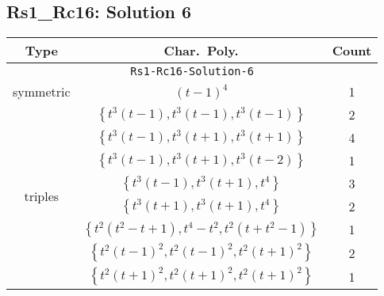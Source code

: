 \documentclass{article}
\begin{document}
        \subsection{Rs1\_Rc16: Solution 6}
        \begin{tabular}{|c|c|c|}
        \hline
        \textbf{Type} & \textbf{Char.~Poly.} & \textbf{Count} \\
        \hline \multicolumn{3}{|c|}{\texttt{Rs1-Rc16-Solution-6}} \\ \hline
        \multirow{1}{*}{symmetric}
        & $(t - 1)^4$ & 1 \\
        \hline
        \multirow{8}{*}{triples}
         & $\left\{t^3(t - 1),t^3(t - 1),t^3(t - 1)\right\}$ & 2 \\
         & $\left\{t^3(t - 1),t^3(t + 1),t^3(t + 1)\right\}$ & 4 \\
         & $\left\{t^3(t - 1),t^3(t + 1),t^3(t - 2)\right\}$ & 1 \\
         & $\left\{t^3(t - 1),t^3(t + 1),t^4\right\}$ & 3 \\
         & $\left\{t^3(t + 1),t^3(t + 1),t^4\right\}$ & 2 \\
         & $\left\{t^2(t^2 - t + 1),t^4 - t^2,t^2(t + t^2 - 1)\right\}$ & 1 \\
         & $\left\{t^2(t - 1)^2,t^2(t - 1)^2,t^2(t + 1)^2\right\}$ & 2 \\
         & $\left\{t^2(t + 1)^2,t^2(t + 1)^2,t^2(t + 1)^2\right\}$ & 1 \\
        \hline
        \end{tabular}
        
        \newpage
        
\end{document}
